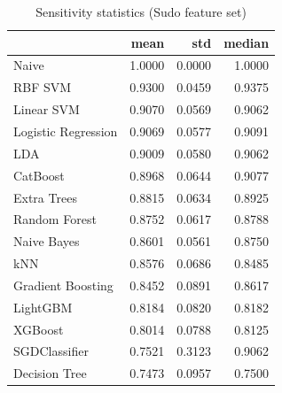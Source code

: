 \begin{table}
\caption{Sensitivity statistics (Sudo feature set)}
\label{tab:sensitivity_Sudo_stats}
\begin{tabular}{lrrr}
\toprule
 & mean & std & median \\
\midrule
Naive & 1.0000 & 0.0000 & 1.0000 \\
RBF SVM & 0.9300 & 0.0459 & 0.9375 \\
Linear SVM & 0.9070 & 0.0569 & 0.9062 \\
Logistic Regression & 0.9069 & 0.0577 & 0.9091 \\
LDA & 0.9009 & 0.0580 & 0.9062 \\
CatBoost & 0.8968 & 0.0644 & 0.9077 \\
Extra Trees & 0.8815 & 0.0634 & 0.8925 \\
Random Forest & 0.8752 & 0.0617 & 0.8788 \\
Naive Bayes & 0.8601 & 0.0561 & 0.8750 \\
kNN & 0.8576 & 0.0686 & 0.8485 \\
Gradient Boosting & 0.8452 & 0.0891 & 0.8617 \\
LightGBM & 0.8184 & 0.0820 & 0.8182 \\
XGBoost & 0.8014 & 0.0788 & 0.8125 \\
SGDClassifier & 0.7521 & 0.3123 & 0.9062 \\
Decision Tree & 0.7473 & 0.0957 & 0.7500 \\
\bottomrule
\end{tabular}
\end{table}

